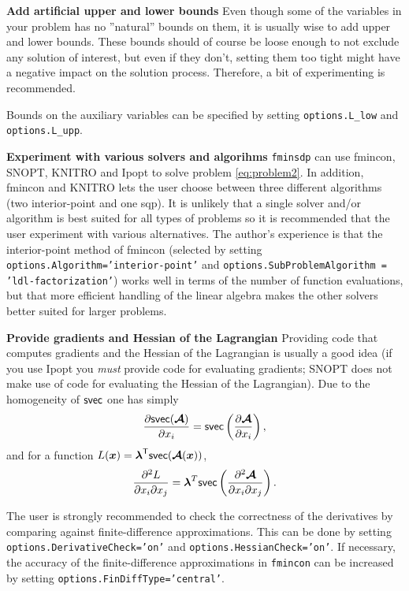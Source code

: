 \documentclass{article}
\newcommand{\bm}[1]{\mbox{\boldmath $#1$}}
\newcommand{\T}{\textsf{T}}
\newcommand{\svec}{\mbox{\textsf{svec}}}
\begin{document}
\vskip 2mm
\noindent\textbf{Add artificial upper and lower bounds}
\vskip 2mm
\noindent Even though some of the variables in your problem has no  ''natural'' bounds on them, it is usually wise
to add upper and lower bounds. These bounds should of course be loose enough to not exclude any solution of 
interest, but even if they don't, setting them too tight might have a negative impact on the solution process.
Therefore, a bit of experimenting is recommended.

Bounds on the auxiliary variables can be specified by setting \texttt{options.L\_low} and \texttt{options.L\_upp}.


\vskip 5mm
\noindent\textbf{Experiment with various solvers and algorihms}
\vskip 2mm
\noindent \texttt{fminsdp} can use fmincon, SNOPT, KNITRO and Ipopt to solve problem \eqref{eq:problem2}. In addition, fmincon
and KNITRO lets the user choose between three different algorithms (two interior-point and one sqp). It is unlikely that a single solver and/or algorithm is best suited for all types of problems so it is recommended that the user experiment with various 
alternatives. The author's experience is that the interior-point method of fmincon (selected by setting \texttt{options.Algorithm='interior-point'} and \texttt{options.SubProblemAlgorithm = 'ldl-factorization'}) works well in
terms of the number of function evaluations, but that more efficient handling of the linear algebra makes the other solvers 
better suited for larger problems.

\vskip 5mm
\noindent\textbf{Provide gradients and Hessian of the Lagrangian}
\vskip 2mm
\noindent Providing code that computes gradients and the Hessian of the Lagrangian is usually a good idea (if you use Ipopt you \textit{must} provide code for evaluating gradients; SNOPT does not make use of code for evaluating the Hessian of the Lagrangian). Due to the homogeneity of $\svec$ one has simply
\begin{equation}\nonumber
\frac{\partial \svec(\bm{\mathcal{A}})}{\partial x_{i}} = \svec\left(\frac{\partial \bm{\mathcal{A}}}{\partial x_{i}}\right),
\end{equation}
and for a function $L(\bm{x}) = \bm{\lambda}^{\T}\svec(\bm{\mathcal{A}}(\bm{x}))$,
\begin{equation}\nonumber
\frac{\partial^2 L}{\partial x_{i}\partial x_{j}} =  \bm{\lambda}^{T}\svec\left(\frac{\partial^2 \bm{\mathcal{A}}}{\partial x_{i}\partial x_{j}}\right).
\end{equation}

The user is strongly recommended to check the correctness of the derivatives by comparing against finite-difference 
approximations. This can be done by setting \texttt{options.DerivativeCheck='on'} and \texttt{options.HessianCheck='on'}. 
If necessary, the accuracy of the finite-difference approximations in \texttt{fmincon} can be increased by setting
\texttt{options.FinDiffType='central'}.
\end{document}
